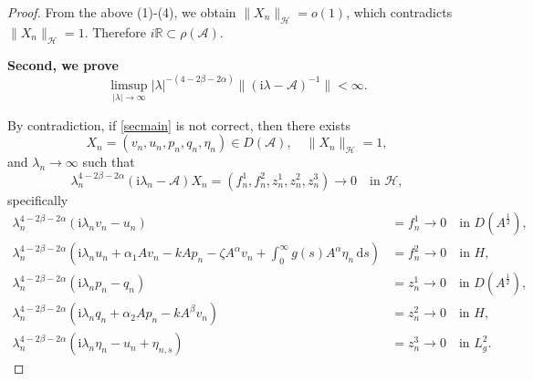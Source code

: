 \documentclass[10pt,a4paper]{amsart}
\begin{document}
\begin{proof}
		From the above (1)-(4), we obtain $\|X_n\|_{\mathcal{H}}=o(1) $, which contradicts $\|X_n\|_{\mathcal{H}} = 1$.
		Therefore $i\mathbb{R} \subset \rho(\mathcal{A})$.

{\bf Second, we prove
\begin{equation}\label{secmain}
\limsup_{|\lambda| \to \infty} |\lambda|^{-{(4 - 2\beta - 2\alpha)}} \| (\mathrm{i}\lambda -\mathcal{A})^{-1} \| < \infty.
\end{equation}
}

By contradiction, if \eqref{secmain} is not correct, then there exists
		\[
		X_n = (v_n, u_n, p_n, q_n,\eta_n) \in D(\mathcal{A}),\quad \|X_n\|_\mathcal{H}= 1,
		\]
		and $\lambda_n \to \infty$ such that
		\begin{equation}\label{sj}
			\lambda_n^{4 - 2\beta - 2\alpha} (\mathrm{i}\lambda_n - \mathcal{A})X_n = (f_n^1, f_n^2, z_n^1, z_n^2, z_n^3) \to 0 \quad \text{in } \mathcal{H},
		\end{equation}
	specifically
		\begin{align}
			\lambda_n^{4 - 2\beta - 2\alpha} (\mathrm{i}\lambda_n v_n - u_n) &= f_n^1\to0 \quad \text{in } {D}({A}^{\frac{1}{2}}),\label{sj1} \\
			\lambda_n^{4 - 2\beta - 2\alpha} \left( \mathrm{i}\lambda_n u_n + \alpha_1 A v_n - k A p_n -\zeta A^\alpha v_n+ \int_0^\infty g(s) A^\alpha\eta_n \, \mathrm{d}s \right) &= f_n^2\to0 \quad \text{in } {H}, \label{sj2}\\
			\lambda_n^{4 - 2\beta - 2\alpha} (\mathrm{i}\lambda_n p_n - q_n) &= z_n^1\to0 \quad \text{in } {D}({A}^{\frac{1}{2}}), \label{sj3} \\
			\lambda_n^{4 - 2\beta - 2\alpha} \left( \mathrm{i}\lambda_n q_n + \alpha_2 A p_n - k A^\beta v_n \right) &= z_n^2\to0 \quad \text{in } {H},  \label{sj4}\\
			\lambda_n^{4 - 2\beta - 2\alpha} (\mathrm{i}\lambda_n \eta_n - u_n + \eta_{n,s}) &= z_n^3\to0 \quad \text{in } L_g^2.\label{sj5}
		\end{align}


\end{proof}
\end{document}
